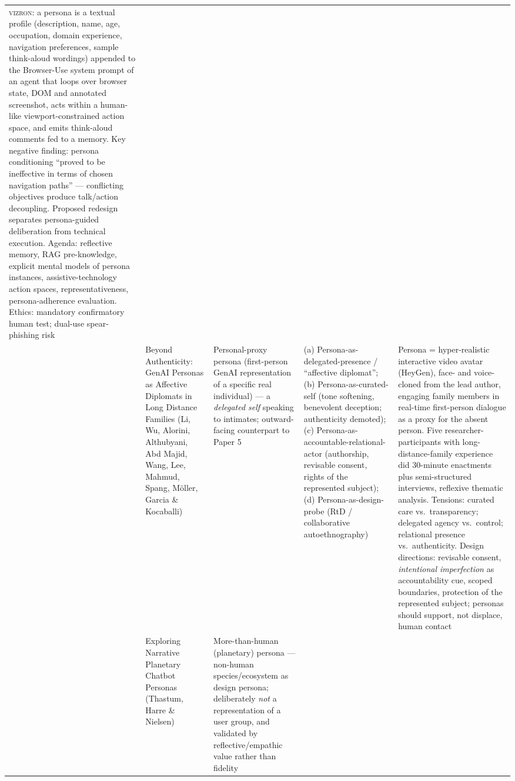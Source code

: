 \begin{table}[t]
\begin{tabular}{p{0.5cm} p{3.6cm} p{3.4cm} p{3.6cm} p{3.6cm}}
\textsc{vizron}: a persona is a textual profile (description, name, age, occupation, domain experience, navigation preferences, sample think-aloud wordings) appended to the Browser-Use system prompt of an agent that loops over browser state, DOM and annotated screenshot, acts within a human-like viewport-constrained action space, and emits think-aloud comments fed to a memory. Key negative finding: persona conditioning ``proved to be ineffective in terms of chosen navigation paths'' --- conflicting objectives produce talk/action decoupling. Proposed redesign separates persona-guided deliberation from technical execution. Agenda: reflective memory, RAG pre-knowledge, explicit mental models of persona instances, assistive-technology action spaces, representativeness, persona-adherence evaluation. Ethics: mandatory confirmatory human test; dual-use spear-phishing risk \\
\addlinespace
14 & Beyond Authenticity: GenAI Personas as Affective Diplomats in Long Distance Families (Li, Wu, Alorini, Althubyani, Abd Majid, Wang, Lee, Mahmud, Spang, Möller, Garcia \& Kocaballi) &
Personal-proxy persona (first-person GenAI representation of a specific real individual) --- a \emph{delegated self} speaking to intimates; outward-facing counterpart to Paper 5 &
(a) Persona-as-delegated-presence / ``affective diplomat''; (b) Persona-as-curated-self (tone softening, benevolent deception; authenticity demoted); (c) Persona-as-accountable-relational-actor (authorship, revisable consent, rights of the represented subject); (d) Persona-as-design-probe (RtD / collaborative autoethnography) &
Persona = hyper-realistic interactive video avatar (HeyGen), face- and voice-cloned from the lead author, engaging family members in real-time first-person dialogue as a proxy for the absent person. Five researcher-participants with long-distance-family experience did 30-minute enactments plus semi-structured interviews, reflexive thematic analysis. Tensions: curated care vs.\ transparency; delegated agency vs.\ control; relational presence vs.\ authenticity. Design directions: revisable consent, \emph{intentional imperfection} as accountability cue, scoped boundaries, protection of the represented subject; personas should support, not displace, human contact \\
\addlinespace
15 & Exploring Narrative Planetary Chatbot Personas (Thastum, Harre \& Nielsen) &
More-than-human (planetary) persona --- non-human species/ecosystem as design persona; deliberately \emph{not} a representation of a user group, and validated by reflective/empathic value rather than fidelity &

\end{tabular}
\end{table}
